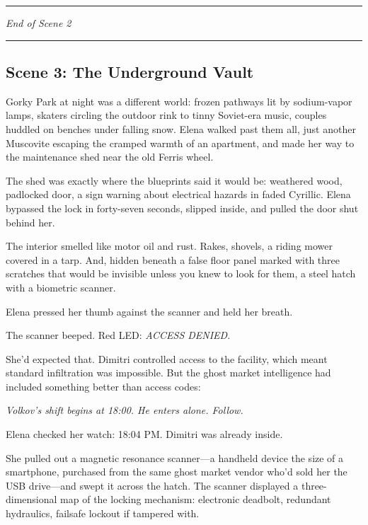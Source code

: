 \begin{center}\rule{0.5\linewidth}{0.5pt}\end{center}

\emph{End of Scene 2}

\begin{center}\rule{0.5\linewidth}{0.5pt}\end{center}

\hypertarget{scene-3-the-underground-vault}{%
\subsection{Scene 3: The Underground Vault}\label{scene-3-the-underground-vault}}

Gorky Park at night was a different world: frozen pathways lit by sodium-vapor lamps, skaters circling the outdoor rink to tinny Soviet-era music, couples huddled on benches under falling snow. Elena walked past them all, just another Muscovite escaping the cramped warmth of an apartment, and made her way to the maintenance shed near the old Ferris wheel.

The shed was exactly where the blueprints said it would be: weathered wood, padlocked door, a sign warning about electrical hazards in faded Cyrillic. Elena bypassed the lock in forty-seven seconds, slipped inside, and pulled the door shut behind her.

The interior smelled like motor oil and rust. Rakes, shovels, a riding mower covered in a tarp. And, hidden beneath a false floor panel marked with three scratches that would be invisible unless you knew to look for them, a steel hatch with a biometric scanner.

Elena pressed her thumb against the scanner and held her breath.

The scanner beeped. Red LED: \emph{ACCESS DENIED}.

She'd expected that. Dimitri controlled access to the facility, which meant standard infiltration was impossible. But the ghost market intelligence had included something better than access codes:

\emph{Volkov's shift begins at 18:00. He enters alone. Follow.}

Elena checked her watch: 18:04 PM. Dimitri was already inside.

She pulled out a magnetic resonance scanner---a handheld device the size of a smartphone, purchased from the same ghost market vendor who'd sold her the USB drive---and swept it across the hatch. The scanner displayed a three-dimensional map of the locking mechanism: electronic deadbolt, redundant hydraulics, failsafe lockout if tampered with.

